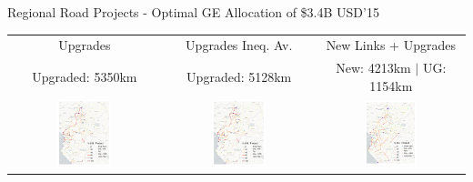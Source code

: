 \documentclass[aspectratio=169,xcolor=dvipsnames]{beamer}
\begin{document}
\begin{frame}{Regional Road Projects - Optimal GE Allocation of \$3.4B USD'15}
\vspace{-1mm}
\begin{adjustbox}{center}
\begin{tabular}{@{}c@{}|@{}c@{}|@{}c@{}} 
Upgrades & Upgrades Ineq. Av. & New Links + Upgrades \\
Upgraded: 5350km & Upgraded: 5128km & New: 4213km $|$ UG: 1154km \\ 
\includegraphics[width=0.38\textwidth, trim= {0.9cm 0 0.9cm 0}, clip]{"../figures/GE/trans_africa_network_GE_20g_3200m_fixed_cgc_sigma3.8_rho0_julia_MACR_90kmh_google_perc_ug.pdf"} & 
\includegraphics[width=0.38\textwidth, trim= {0.9cm 0 0.9cm 0}, clip]{"../figures/GE/trans_africa_network_GE_20g_3200m_fixed_cgc_sigma3.8_rho2_julia_MACR_90kmh_google_perc_ug.pdf"} &
\includegraphics[width=0.38\textwidth, trim= {0.9cm 0 0.9cm 0}, clip]{"../figures/GE/trans_africa_network_GE_add_20g_3200m_fixed_cgc_sigma3.8_rho0_julia_MACR_90kmh_google_perc_ug.pdf"}  
\end{tabular}
\end{adjustbox}
\end{frame}
\end{document}
